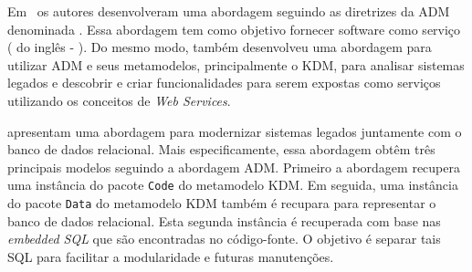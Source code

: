 Em~\cite{5741334, SMR:SMR582} os autores desenvolveram uma abordagem seguindo as diretrizes da ADM denominada . Essa abordagem tem como objetivo fornecer software como serviço ( do inglês - ). %
Do mesmo modo,  também desenvolveu uma abordagem para utilizar ADM e seus metamodelos, principalmente o KDM, para analisar sistemas legados e descobrir e criar funcionalidades para serem expostas como serviços utilizando os conceitos de \textit{Web Services}.


 apresentam uma abordagem para modernizar sistemas legados juntamente com o banco de dados relacional. Mais especificamente, essa abordagem obtêm três principais modelos seguindo a abordagem ADM. Primeiro a abordagem recupera uma instância do pacote \texttt{Code} do metamodelo KDM. Em seguida, uma instância do pacote \texttt{Data} do metamodelo KDM também é recupara para representar o banco de dados relacional. Esta segunda instância é recuperada com base nas \textit{embedded SQL} que são encontradas no código-fonte. O objetivo é separar tais SQL para facilitar a modularidade e futuras manutenções. 

